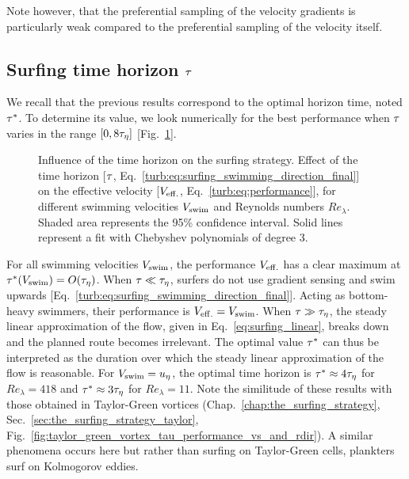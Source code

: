Note however, that the preferential sampling of the velocity gradients is particularly weak compared to the preferential sampling of the velocity itself.

\subsection{Surfing time horizon $\tau$}\label{sec:surfing_time_horizon}

We recall that the previous results correspond to the optimal horizon time, noted $\tau^*$. To determine its value, we look numerically for the best performance when $\tau$ varies in the range $[0, 8\tau_{\eta}]$  [Fig.~\ref{fig:surfing_parameter_tau_vs}].
\begin{figure}%
	\centering
	
	\caption[Influence of the time horizon on the surfing strategy.]{
		Influence of the time horizon on the surfing strategy.
		Effect of the time horizon [$\tau$, Eq.~\eqref{turb:eq:surfing_swimming_direction_final}] on the effective velocity [$V_{\mathrm{eff.}}$, Eq.~\eqref{turb:eq:performance}], for different swimming velocities $V_{\mathrm{swim}}$ and Reynolds numbers $\mathit{Re}_{\lambda}$.
		Shaded area represents the 95\% confidence interval.
		Solid lines represent a fit with Chebyshev polynomials of degree 3.
	}
	\label{fig:surfing_parameter_tau_vs}
\end{figure}
For all swimming velocities $V_{\mathrm{swim}}$, the performance $V_{\mathrm{eff.}}$ has a clear maximum at $\tau^*(V_{\mathrm{swim}}) = O(\tau_{\eta})$.
When $\tau \ll \tau_{\eta}$, surfers do not use gradient sensing and swim upwards [Eq.~\eqref{turb:eq:surfing_swimming_direction_final}].
Acting as bottom-heavy swimmers, their performance is $V_{\mathrm{eff.}} = V_{\mathrm{swim}}$.
When $\tau \gg \tau_{\eta}$, the steady linear approximation of the flow, given in Eq.~\eqref{eq:surfing_linear}, breaks down and the planned route becomes irrelevant.
The optimal value $\tau^*$ can thus be interpreted as the duration over which the steady linear approximation of the flow is reasonable.
For $V_{\mathrm{swim}} = u_{\eta}$, the optimal time horizon is $\tau^* \approx 4 \tau_{\eta}$ for $\mathit{Re}_{\lambda} = 418$ and $\tau^* \approx 3 \tau_{\eta}$ for $\mathit{Re}_{\lambda} = 11$.
Note the similitude of these results with those obtained in Taylor-Green vortices (Chap.~\ref{chap:the_surfing_strategy}, Sec.~\ref{sec:the_surfing_strategy_taylor}, Fig.~\ref{fig:taylor_green_vortex_tau_performance_vs_and_rdir}).
A similar phenomena occurs here but rather than surfing on Taylor-Green cells, plankters surf on Kolmogorov eddies.

